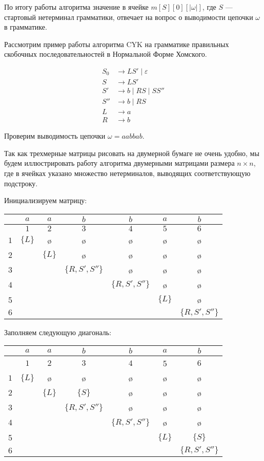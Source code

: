 По итогу работы алгоритма значение в ячейке $m[S][0][|\omega|]$, где $S$ --- стартовый нетерминал грамматики, отвечает на вопрос о выводимости цепочки $\omega$ в грамматике. 

\begin{example}
  Рассмотрим пример работы алгоритма CYK на грамматике правильных скобочных последовательностей в Нормальной Форме Хомского. 

  \begin{align*}
    S_0 &\to L S' \mid \varepsilon \\ 
    S   &\to L S' \\ 
    S'  &\to b \mid R S \mid S S'' \\ 
    S'' &\to b \mid R S \\
    L   &\to a \\ 
    R   &\to b
  \end{align*}
  
Проверим выводимость цепочки $\omega = a a b b a b$.

Так как трехмерные матрицы рисовать на двумерной бумаге не очень удобно, мы будем иллюстрировать работу алгоритма двумерными матрицами размера $n \times n$, где в ячейках указано множество нетерминалов, выводящих соответствующую подстроку. 

Инициализируем матрицу: 

\begin{center}
  \begin{tabular}{c||cc|cc|cc}
    & $a$ & $a$ & $b$ & $b$ & $a$ & $b$ \\ \hline
    & $1$ & $2$ & $3$ & $4$ & $5$ & $6$ \\ \hline \hline
  $1$ & $\{L\}$ & \o & \o & \o & \o & \o \\ 
  $2$ &   & $\{L\}$ & \o & \o & \o & \o \\ \hline
  $3$ &   &   & $\{R, S', S''\}$ & \o & \o & \o \\ 
  $4$ &   &   &   & $\{R, S', S''\}$ & \o & \o \\ \hline
  5 &   &   &   &   & $\{L\}$ & \o \\ 
  $6$ &   &   &   &   &   & $\{R, S', S''\}$
  \end{tabular}
\end{center}

Заполняем следующую диагональ:

\begin{center}
  \begin{tabular}{c||cc|cc|cc}
    & $a$ & $a$ & $b$ & $b$ & $a$ & $b$ \\ \hline
    & $1$ & $2$ & $3$ & $4$ & 5 & $6$ \\ \hline \hline
  $1$ & $\{L\}$ & \o & \o & \o & \o & \o \\ 
  $2$ &   & $\{L\}$ & $\{S\}$ & \o & \o & \o \\ \hline
  $3$ &   &   & $\{R, S', S''\}$ & \o & \o & \o \\ 
  $4$ &   &   &   & $\{R, S', S''\}$ & \o & \o \\ \hline
  5 &   &   &   &   & $\{L\}$ & $\{S\}$ \\ 
  $6$ &   &   &   &   &   & $\{R, S', S''\}$
  \end{tabular}
\end{center}


\end{example}
